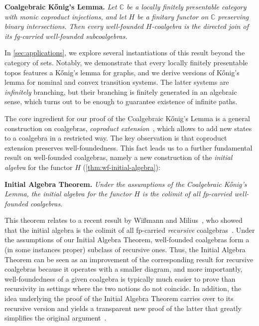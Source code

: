 \documentclass[10pt,a4paper]{article}
\theoremstyle{definition}
\theoremstyle{remark}
\numberwithin{equation}{section}
\newcommand{\Konig}{Kőnig}
\newcommand{\lfplong}{locally finitely presentable\xspace}
\providecommand{\C}{}
\renewcommand{\C}{{\mathbb{C}}}
\theoremstyle{plain}
\theoremstyle{definition}
\begin{document}
\medskip\noindent \textsf{\bfseries Coalgebraic \Konig's Lemma.} \emph{Let $\C$ be a \lfplong category with monic coproduct injections, and let $H$ be a finitary functor on $\C$ preserving binary intersections. Then every well-founded $H$-coalgebra is the directed join of its fg-carried well-founded subcoalgebras.}

\medskip\noindent In \autoref{sec:applications}, we explore several instantiations of this result beyond the category of sets. Notably, we demonstrate that every \lfplong topos features a \Konig's lemma for graphs, and we derive versions of \Konig's lemma for nominal and convex transition systems. The latter systems are \emph{infinitely} branching, but their branching is finitely generated in an algebraic sense, which turns out to be enough to guarantee existence of infinite paths.

The core ingredient for our proof of the Coalgebraic \Konig's Lemma is a general construction on coalgebras, \emph{coproduct extension}~\cite{amv06,urbat17,lffiac,mpw16}, which allows to add new states to a coalgebra in a restricted way. The key observation is that coproduct extension preserves well-foundedness. This fact leads us to a further fundamental result on well-founded coalgebras, namely a new construction of the \emph{initial algebra} for the functor $H$ (\autoref{thm:wf-initial-algebra}):

\medskip\noindent \textsf{\bfseries Initial Algebra Theorem.} \emph{Under the assumptions of the Coalgebraic \Konig's Lemma, the initial algebra for the functor $H$ is the colimit of all fp-carried well-founded coalgebras.}

\medskip\noindent This theorem relates to a recent result by Wißmann and Milius~\cite{wm24}, who showed that the initial algebra is the colimit of all fp-carried \emph{recursive} coalgebras~\cite{taylor99}. Under the assumptions of our Initial Algebra Theorem, well-founded coalgebras form a (in some instances proper) subclass of recursive ones. Thus,
the Initial Algebra Theorem can be seen as an improvement of the corresponding result for recursive coalgebras because it operates with a smaller diagram, and more importantly, well-foundedness of a given coalgebra is typically much easier to prove than recursivity in settings where the two notions do not coincide. In addition, the idea underlying the proof of the Initial Algebra Theorem carries over to its recursive version and yields a transparent new proof of the latter that greatly simplifies the original argument~\cite{wm24}.
\end{document}
